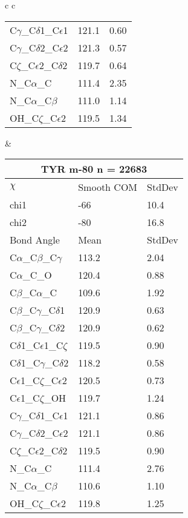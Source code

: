 \begin{longtable}{ c c }
\begin{tabular}{ l l l }
  C$\gamma$\_C$\delta$1\_C$\epsilon$1 & 121.1 & 0.60\\
  C$\gamma$\_C$\delta$2\_C$\epsilon$2 & 121.3 & 0.57\\
  C$\zeta$\_C$\epsilon$2\_C$\delta$2 & 119.7 & 0.64\\
  N\_C$\alpha$\_C & 111.4 & 2.35\\
  N\_C$\alpha$\_C$\beta$ & 111.0 & 1.14\\
  OH\_C$\zeta$\_C$\epsilon$2 & 119.5 & 1.34\\
  \bottomrule
  \end{tabular}
  &
  \begin{tabular}{ l l l }
  \toprule
  \multicolumn{3}{c}{TYR \textbf{m-80} n = 22683} \\ \toprule
  $\chi$       & Smooth COM & StdDev \\ \midrule
  chi1 & -66 & 10.4 \\ 
  chi2 & -80 & 16.8 \\ \midrule
  Bond Angle   & Mean     & StdDev \\ \midrule
  C$\alpha$\_C$\beta$\_C$\gamma$ & 113.2 & 2.04\\
  C$\alpha$\_C\_O & 120.4 & 0.88\\
  C$\beta$\_C$\alpha$\_C & 109.6 & 1.92\\
  C$\beta$\_C$\gamma$\_C$\delta$1 & 120.9 & 0.63\\
  C$\beta$\_C$\gamma$\_C$\delta$2 & 120.9 & 0.62\\
  C$\delta$1\_C$\epsilon$1\_C$\zeta$ & 119.5 & 0.90\\
  C$\delta$1\_C$\gamma$\_C$\delta$2 & 118.2 & 0.58\\
  C$\epsilon$1\_C$\zeta$\_C$\epsilon$2 & 120.5 & 0.73\\
  C$\epsilon$1\_C$\zeta$\_OH & 119.7 & 1.24\\
  C$\gamma$\_C$\delta$1\_C$\epsilon$1 & 121.1 & 0.86\\
  C$\gamma$\_C$\delta$2\_C$\epsilon$2 & 121.1 & 0.86\\
  C$\zeta$\_C$\epsilon$2\_C$\delta$2 & 119.5 & 0.90\\
  N\_C$\alpha$\_C & 111.4 & 2.76\\
  N\_C$\alpha$\_C$\beta$ & 110.6 & 1.10\\
  OH\_C$\zeta$\_C$\epsilon$2 & 119.8 & 1.25\\
  \bottomrule
  \end{tabular}
  \\
  
\end{longtable}

